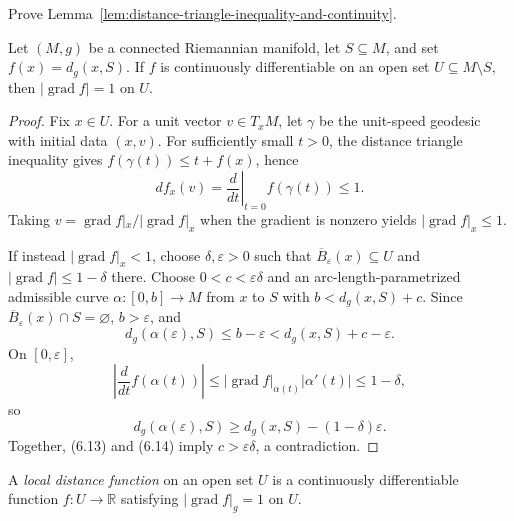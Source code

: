 \begin{exercise}
\label{exer:prove-distance-lemma}

Prove Lemma~\ref{lem:distance-triangle-inequality-and-continuity}.
\end{exercise}

\begin{theorem}
\label{thm:distance-to-subset-unit-gradient}

Let $(M,g)$ be a connected Riemannian manifold, let $S\subseteq M$, and set
$f(x)=d_g(x,S)$. If $f$ is continuously differentiable on an open set
$U\subseteq M\setminus S$, then
$|\operatorname{grad}f|=1$ on $U$.
\end{theorem}

\begin{proof}
\sketch Fix $x\in U$. For a unit vector $v\in T_xM$, let $\gamma$ be the
unit-speed geodesic with initial data $(x,v)$. For sufficiently small $t>0$,
the distance triangle inequality gives
$f(\gamma(t))\leq t+f(x)$, hence
\[
df_x(v)=\left.\frac d{dt}\right|_{t=0}f(\gamma(t))\leq1.
\]
Taking $v=\operatorname{grad}f|_x/|\operatorname{grad}f|_x$ when the gradient
is nonzero yields $|\operatorname{grad}f|_x\leq1$.

If instead $|\operatorname{grad}f|_x<1$, choose $\delta,\varepsilon>0$ such
that $\overline B_\varepsilon(x)\subseteq U$ and
$|\operatorname{grad}f|\leq1-\delta$ there. Choose
$0<c<\varepsilon\delta$ and an arc-length-parametrized admissible curve
$\alpha:[0,b]\to M$ from $x$ to $S$ with
$b<d_g(x,S)+c$. Since $\overline B_\varepsilon(x)\cap S=\varnothing$,
$b>\varepsilon$, and
\begin{equation}
d_g(\alpha(\varepsilon),S)
\leq b-\varepsilon<d_g(x,S)+c-\varepsilon.
\tag{6.13}
\end{equation}
On $[0,\varepsilon]$,
\[
\left|\frac d{dt}f(\alpha(t))\right|
\leq|\operatorname{grad}f|_{\alpha(t)}|\alpha'(t)|\leq1-\delta,
\]
so
\begin{equation}
d_g(\alpha(\varepsilon),S)
\geq d_g(x,S)-(1-\delta)\varepsilon.
\tag{6.14}
\end{equation}
Together, (6.13) and (6.14) imply $c>\varepsilon\delta$, a contradiction.
\end{proof}

A \emph{local distance function} on an open set $U$ is a continuously
differentiable function $f:U\to\mathbb R$ satisfying
$|\operatorname{grad}f|_g=1$ on $U$.

